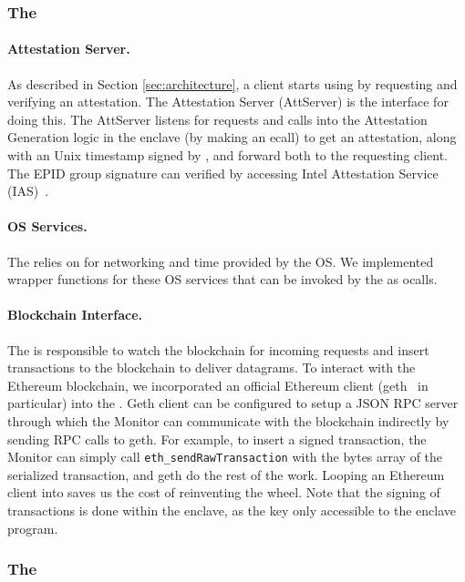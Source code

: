 \subsubsection{The \medname}

\paragraph{Attestation Server.} As described in Section \ref{sec:architecture},
a client starts using \tc by requesting and verifying an attestation.  The
Attestation Server (AttServer) is the interface for doing this.  The AttServer
listens for requests and calls into the Attestation Generation logic in the
enclave (by making an ecall) to get an attestation, along with an Unix timestamp
signed by \pkTC, and forward both to the requesting client.  The EPID group
signature can verified by accessing Intel Attestation Service (IAS)~\cite{}. 

\paragraph{OS Services.} The \encname relies on \medname for networking and
time provided by the OS. We implemented wrapper functions for these OS services 
that can be invoked by the \encname as ocalls.

\paragraph{Blockchain Interface.} The \medname is responsible to watch the
blockchain for incoming requests and insert transactions to the blockchain to
deliver datagrams. To interact with the Ethereum blockchain, we incorporated an
official Ethereum client (geth~\cite{geth} in particular) into the \medname.
Geth client can be configured to setup a JSON RPC server through which the
Monitor can communicate with the blockchain indirectly by sending RPC calls to
geth. For example, to insert a signed transaction, the Monitor can simply call
\texttt{eth\_sendRawTransaction} with the bytes array of the serialized
transaction, and geth do the rest of the work. Looping an Ethereum
client into \medname saves us the cost of reinventing the wheel. 
Note that the signing of transactions is done within the enclave, as the key
\pkTC only accessible to the enclave program.

\subsubsection{The \encname}

